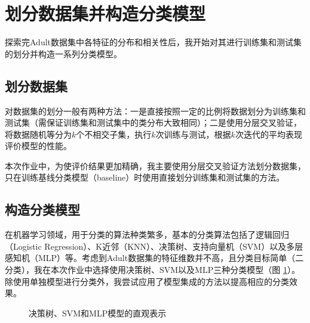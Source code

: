 \documentclass[12pt,a4paper]{article}
\theoremstyle{definition}
\begin{document}
{\section{划分数据集并构造分类模型}

探索完Adult数据集中各特征的分布和相关性后，我开始对其进行训练集和测试集的划分并构造一系列分类模型。

\subsection{划分数据集}

对数据集的划分一般有两种方法：一是直接按照一定的比例将数据划分为训练集和测试集（需保证训练集和测试集中的类分布大致相同）；二是使用分层交叉验证，将数据随机等分为$k$个不相交子集，执行$k$次训练与测试，根据$k$次迭代的平均表现评价模型的性能。

\vspace{0.01\linewidth}
本次作业中，为使评价结果更加精确，我主要使用分层交叉验证方法划分数据集，只在训练基线分类模型（baseline）时使用直接划分训练集和测试集的方法。

\subsection{构造分类模型}

在机器学习领域，用于分类的算法种类繁多，基本的分类算法包括了逻辑回归（Logistic Regression）、K近邻（KNN）、决策树、支持向量机（SVM）以及多层感知机（MLP）等。考虑到Adult数据集的特征维数并不高，且分类目标简单（二分类），我在本次作业中选择使用决策树、SVM以及MLP三种分类模型（图 \ref{fig:model-init}）。除使用单独模型进行分类外，我尝试应用了模型集成的方法以提高相应的分类效果。

\begin{figure}[H]
	\centering
	\caption{决策树、SVM和MLP模型的直观表示}
	\label{fig:model-init}
\end{figure}

}
\end{document}
